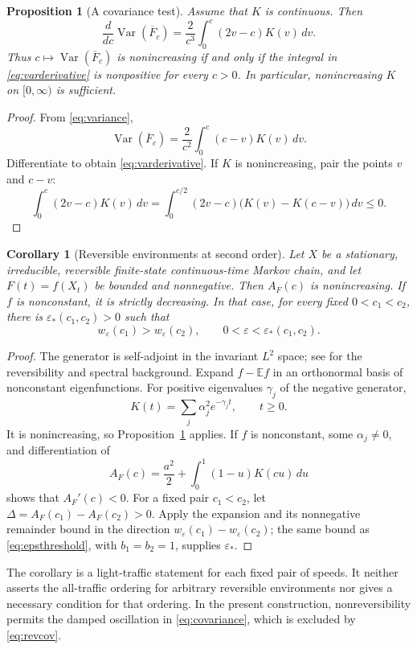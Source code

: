 \documentclass[11pt,reqno]{amsart}
\numberwithin{equation}{section}
\theoremstyle{plain}
\newtheorem{proposition}[theorem]{Proposition}
\newtheorem{corollary}[theorem]{Corollary}
\theoremstyle{definition}
\newcommand{\E}{\mathbb E}
\newcommand{\1}{\mathbf 1}
\newcommand{\eps}{\varepsilon}
\DeclareMathOperator{\Var}{Var}
\begin{document}
\begin{proposition}[A covariance test]\label{prop:derivative}
Assume that $K$ is continuous. Then
\begin{equation}\label{eq:varderivative}
 \frac{d}{dc}\Var(\overline F_c)
 =\frac2{c^3}\int_0^c(2v-c)K(v)\,dv.
\end{equation}
Thus $c\mapsto\Var(\overline F_c)$ is nonincreasing if and only if the integral in \eqref{eq:varderivative} is nonpositive for every $c>0$. In particular, nonincreasing $K$ on $[0,\infty)$ is sufficient.
\end{proposition}
\begin{proof}
From \eqref{eq:variance},
\[
 \Var(\overline F_c)=\frac2{c^2}\int_0^c(c-v)K(v)\,dv.
\]
Differentiate to obtain \eqref{eq:varderivative}. If $K$ is nonincreasing, pair the points $v$ and $c-v$:
\[
 \int_0^c(2v-c)K(v)\,dv
 =\int_0^{c/2}(2v-c)\bigl(K(v)-K(c-v)\bigr)\,dv\le0.
\]
\end{proof}

\begin{corollary}[Reversible environments at second order]\label{cor:reversible}
Let $X$ be a stationary, irreducible, reversible finite-state continuous-time Markov chain, and let $F(t)=f(X_t)$ be bounded and nonnegative. Then $A_F(c)$ is nonincreasing. If $f$ is nonconstant, it is strictly decreasing. In that case, for every fixed $0<c_1<c_2$, there is $\eps_*(c_1,c_2)>0$ such that
\[
 w_\eps(c_1)>w_\eps(c_2),\qquad 0<\eps<\eps_*(c_1,c_2).
\]
\end{corollary}
\begin{proof}
The generator is self-adjoint in the invariant $L^2$ space; see \cite{Kelly79,LevinPeres17} for the reversibility and spectral background. Expand $f-\E f$ in an orthonormal basis of nonconstant eigenfunctions. For positive eigenvalues $\gamma_j$ of the negative generator,
\begin{equation}\label{eq:revcov}
 K(t)=\sum_j\alpha_j^2 e^{-\gamma_j t},\qquad t\ge0.
\end{equation}
It is nonincreasing, so Proposition~\ref{prop:derivative} applies. If $f$ is nonconstant, some $\alpha_j\ne0$, and differentiation of
\[
 A_F(c)=\frac{a^2}{2}+\int_0^1(1-u)K(cu)\,du
\]
shows that $A_F'(c)<0$. For a fixed pair $c_1<c_2$, let $\Delta=A_F(c_1)-A_F(c_2)>0$. Apply the expansion and its nonnegative remainder bound in the direction $w_\eps(c_1)-w_\eps(c_2)$; the same bound as \eqref{eq:epsthreshold}, with $b_1=b_2=1$, supplies $\eps_*$.
\end{proof}
The corollary is a light-traffic statement for each fixed pair of speeds. It neither asserts the all-traffic ordering for arbitrary reversible environments nor gives a necessary condition for that ordering. In the present construction, nonreversibility permits the damped oscillation in \eqref{eq:covariance}, which is excluded by \eqref{eq:revcov}.
\end{document}
